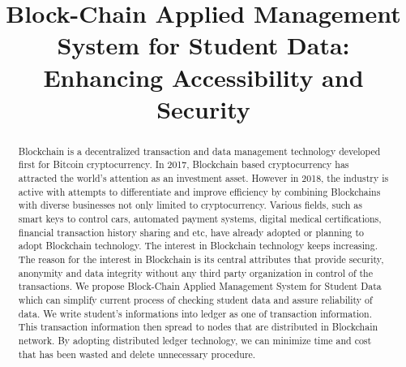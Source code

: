 \documentclass[conference]{IEEEtran}
\begin{document}
\title{Block-Chain Applied Management System for Student Data: Enhancing Accessibility and Security \\
}
\author{
\and
{}
\and
{}
\and
{}
}
\maketitle

\begin{abstract}
Blockchain is a decentralized transaction and data management technology developed first for Bitcoin cryptocurrency. In 2017, Blockchain based cryptocurrency has attracted the world’s attention as an investment asset. However in 2018, the industry is active with attempts to differentiate and improve efficiency by combining Blockchains with diverse businesses not only limited to cryptocurrency. Various fields, such as smart keys to control cars, automated payment systems, digital medical certifications, financial transaction history sharing and etc, have already adopted or planning to adopt Blockchain technology. The interest in Blockchain technology keeps increasing. The reason for the interest in Blockchain is its central attributes that provide security, anonymity and data integrity without any third party organization in control of the transactions. We propose Block-Chain Applied Management System for Student Data which can simplify current process of checking student data and assure reliability of data. We write student’s informations into ledger as one of transaction information. This transaction information then spread to nodes that are distributed in Blockchain network. By adopting distributed ledger technology, we can minimize time and cost that has been wasted and delete unnecessary procedure.
\end{abstract}
\end{document}
